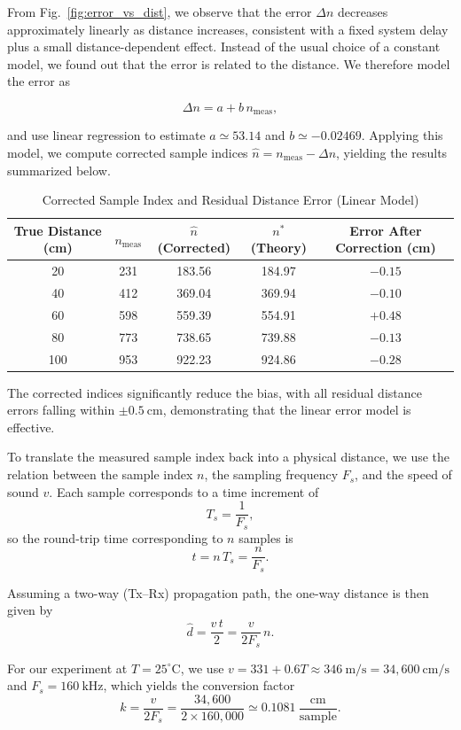 \documentclass[10pt]{article}
\begin{document}
From Fig.~\ref{fig:error_vs_dist}, we observe that the error $\Delta n$ decreases approximately linearly as distance increases, 
consistent with a fixed system delay plus a small distance-dependent effect. 
Instead of the usual choice of a constant model, we found out that the error is related to the distance. 
We therefore model the error as

\[
\Delta n = a + b\,n_{\mathrm{meas}},
\]

and use linear regression to estimate $a \simeq 53.14$ and $b \simeq -0.02469$. Applying this model, we compute corrected sample indices $\hat{n} = n_{\mathrm{meas}} - \Delta n$, yielding the results summarized below.

\begin{table}[h!]
\centering
\caption{Corrected Sample Index and Residual Distance Error (Linear Model)}
\begin{tabular}{|c|c|c|c|c|}
\hline
True Distance (cm) & $n_{\mathrm{meas}}$ & $\hat{n}$ (Corrected) & $n^{*}$ (Theory) & Error After Correction (cm) \\
\hline
20  & 231 & 183.56 & 184.97 & $-0.15$ \\
40  & 412 & 369.04 & 369.94 & $-0.10$ \\
60  & 598 & 559.39 & 554.91 & $+0.48$ \\
80  & 773 & 738.65 & 739.88 & $-0.13$ \\
100 & 953 & 922.23 & 924.86 & $-0.28$ \\
\hline
\end{tabular}\label{tab:corrected_indices}
\end{table}

The corrected indices significantly reduce the bias, with all residual distance errors falling within $\pm 0.5\ \mathrm{cm}$, demonstrating that the linear error model is effective.

To translate the measured sample index back into a physical distance, we use the relation between
the sample index $n$, the sampling frequency $F_s$, and the speed of sound $v$.
Each sample corresponds to a time increment of
\[
T_s = \frac{1}{F_s},
\]
so the round-trip time corresponding to $n$ samples is
\[
t = n \, T_s = \frac{n}{F_s}.
\]

Assuming a two-way (Tx–Rx) propagation path, the one-way distance is then given by
\[
\hat{d} = \frac{v \, t}{2} = \frac{v}{2 F_s}\, n.
\]

For our experiment at $T = 25^\circ\mathrm{C}$, we use
$v = 331 + 0.6T \approx 346\ \mathrm{m/s} = 34{,}600\ \mathrm{cm/s}$ and
$F_s = 160\ \mathrm{kHz}$, which yields the conversion factor
\[
k = \frac{v}{2F_s}
= \frac{34{,}600}{2 \times 160{,}000}
\simeq 0.1081\ \frac{\mathrm{cm}}{\mathrm{sample}}.
\]
\end{document}
